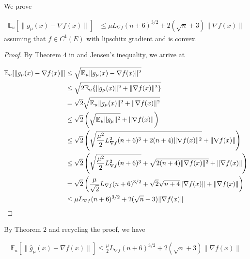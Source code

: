 \documentclass{article}
\begin{document}
We prove

\begin{theorem} \label{July_14_Big_Theorem_1}


\begin{align}
\mathbb{E}_u[\| g_{\mu}(x) - \nabla f(x)\|] & \leq \mu L_{\nabla f}(n+6)^{3/2} + 2(\sqrt{n} + 3)\|\nabla f(x)\| \label{sampling_error_diff_quotient}
\end{align}
assuming that $f \in C^1(E)$ with lipschitz gradient and is convex. 
\begin{proof}
By Theorem $4$ in \cite{Nesterov2015} and Jensen's inequality, we arrive at 

\begin{align}
\mathbb{E}_u[\|g_{\mu}(x) - \nabla f(x)\|] & \leq \sqrt{\mathbb{E}_u\|g_{\mu}(x) - \nabla f(x)\|^2} \notag \\ & \leq \sqrt{2\mathbb{E}_u\{\|g_{\mu}(x)\|^2 + \|\nabla f(x)\|^2\}} \notag \\ & = \sqrt{2}\sqrt{\mathbb{E}_u\|g_{\mu}(x)\|^2 + \|\nabla f(x)\|^2}  \notag \\ & \leq \sqrt{2}\left(\sqrt{\mathbb{E}_u\|g_{\mu}\|^2} + \|\nabla f(x)\|\right) \notag \\ & \leq \sqrt{2}\left( \sqrt{\frac{\mu^2}{2}L_{\nabla f}^2(n+6)^3 + 2(n+4)\|\nabla f(x)\|^2} + \|\nabla f(x)\|\right) \notag \\ & \leq \sqrt{2}\left( \sqrt{\frac{\mu^2}{2}L_{\nabla f}^2(n+6)^3} + \sqrt{2(n+4)\|\nabla f(x)\|^2} + \|\nabla f(x)\| \right) \notag \\ & = \sqrt{2}\left(\frac{\mu}{\sqrt{2}}L_{\nabla f}(n+6)^{3/2} + \sqrt{2}\sqrt{n+4}\|\nabla f(x)\| + \| \nabla f(x)\|\right) \notag \\ & \leq \mu L_{\nabla f}(n+6)^{3/2} + 2(\sqrt{n} + 3)\|\nabla f(x)\|
\end{align}
\end{proof}

\end{theorem}

By Theorem $2$ and recycling the proof, we have 

\begin{theorem}
\begin{align}
\mathbb{E}_u[\| \hat{g}_{\mu}(x) - \nabla f(x)\|] \leq \frac{\mu}{2}L_{\nabla f}(n+6)^{3/2} + 2(\sqrt{n}+3)\|\nabla f(x)\| \label{central_diff_sampling_error}
\end{align}

\end{theorem}
\end{document}
